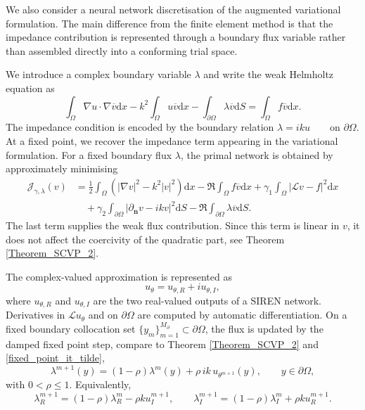 \documentclass[twoside,11pt]{article}
\def\d{{\mathrm d}}
\def\L{{\mathscr{L}}}
\newcommand{\qp}[1]{\ensuremath{\!\left({#1}\right)}}
\def\L{{\mathscr{L}}}
\begin{document}
{We also consider a neural network discretisation of the augmented variational formulation. The main difference from the finite element method is that the impedance contribution is represented through a boundary flux variable rather than assembled directly into a conforming trial space.

We introduce a complex boundary variable $\lambda$ and write the weak Helmholtz equation as
\begin{equation}
\label{eq:nn_flux_weak_form}
\int_\Omega \nabla u\cdot\nabla\overline v \d x
-k^2\int_\Omega u\overline v \d x
-\int_{\partial\Omega}\lambda\overline v \d S
=
\int_\Omega f\overline v \d x .
\end{equation}
The impedance condition is encoded by the boundary relation
$\lambda=iku \qquad \text{on } \partial\Omega.$ At a fixed point, we
recover the impedance term appearing in the variational formulation.
For a fixed boundary flux $\lambda$, the primal network is obtained by
approximately minimising
\begin{equation}
\label{eq:nn_deep_uzawa_functional}
\begin{split}
\mathcal{J}_{\gamma,\lambda}(v)
&=
\frac12\int_\Omega\qp{|\nabla v|^2-k^2|v|^2}\d x
-\Re\int_\Omega f\overline v\d x
+\gamma_1\int_\Omega|\L v-f|^2\d x
\\
&\quad
+\gamma_2\int_{\partial\Omega}
|\partial_{\mathbf n}v-ikv|^2\d S
-\Re\int_{\partial\Omega}\lambda\overline v\d S .
\end{split}
\end{equation}
The last term supplies the weak flux contribution. Since this term is linear in $v$, it does not affect the coercivity of the quadratic part, see Theorem \ref{Theorem_SCVP_2}.


The complex-valued approximation is represented as
\[
u_\theta=u_{\theta,R}+iu_{\theta,I},
\]
where $u_{\theta,R}$ and $u_{\theta,I}$ are the two real-valued outputs of a SIREN network. Derivatives in $\L u_\theta$ and on $\partial\Omega$ are computed by automatic differentiation. On a fixed boundary collocation set $\{y_m\}_{m=1}^{M_\partial}\subset\partial\Omega$, the flux is updated by the damped {fixed point} step, compare to Theorem \ref{Theorem_SCVP_2} and 
\eqref{fixed_point_it_tilde},
\begin{equation}
\label{eq:nn_uzawa_update}
\lambda^{m+1}(y)
=
(1-\rho)\lambda^m(y)
+\rho\,ik\,u_{\theta^{m+1}}(y),
\qquad
y\in\partial\Omega,
\end{equation}
with $0<\rho\le 1$. Equivalently,
\[
\lambda_R^{m+1}
=
(1-\rho)\lambda_R^m-\rho k u_I^{m+1},
\qquad
\lambda_I^{m+1}
=
(1-\rho)\lambda_I^m+\rho k u_R^{m+1}.
\]

}
\end{document}
